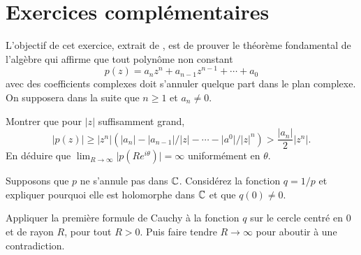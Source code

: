 %
%
%
%
%

\section{Exercices complémentaires}

\begin{exer}
L'objectif de cet exercice, extrait de \cite{lax2011complex}, est de prouver le théorème fondamental de l'algèbre qui affirme que tout polynôme non constant
\[p(z)=a_n z^n + a_{n-1}z^{n-1} + \cdots + a_0\]
avec des coefficients complexes doit s'annuler quelque part dans le plan complexe. On supposera dans la suite que $n \geq 1$ et $a_n \neq 0$.
\begin{MYenumerate}
\item Montrer que pour $\lvert z \rvert$ suffisamment grand, 
\[\lvert p(z)  \rvert  \geq  \lvert z^n  \rvert \left(\lvert a_n  \rvert -\lvert a_{n-1}\rvert/\lvert z\rvert  - \cdots -  \lvert a^{0}\rvert/\lvert z\rvert^n \right)> \frac{\lvert a_n\rvert}{2} \lvert z^n  \rvert.\]
En déduire que $\lim_{R \to \infty} \lvert p(R e^{i \theta}) \rvert = \infty$ uniformément en $\theta$.
\item Supposons que $p$ ne s'annule pas dans $\mathbb{C}$. Considérez la fonction $q=1/p$ et expliquer pourquoi elle est holomorphe dans $\mathbb{C}$ et que $q(0)  \neq 0$.
\item Appliquer la première formule de Cauchy à la fonction $q$ sur le cercle centré en $0$ et de rayon $R$, pour tout $R >0$. Puis faire tendre $R \to \infty$ pour aboutir à une contradiction.
\end{MYenumerate}
\end{exer}

